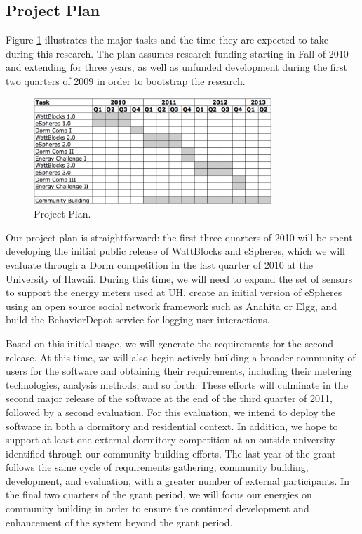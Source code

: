 \subsection{Project Plan}

Figure \ref{fig:plan} illustrates the major tasks and the time they are
expected to take during this research.  The plan assumes research funding
starting in Fall of 2010 and extending for three years, as well as unfunded
development during the first two quarters of 2009 in order to bootstrap the
research.

\begin{figure}[th]
  \center
  \includegraphics[width=0.8\textwidth]{gantt.eps}
  \caption{\small Project Plan.}
 \label{fig:plan}
\end{figure} 

Our project plan is straightforward: the first three quarters of 2010 will
be spent developing the initial public release of WattBlocks and eSpheres,
which we will evaluate through a Dorm competition in the last quarter of
2010 at the University of Hawaii.  During this time, we will need to expand
the set of sensors to support the energy meters used at UH, create an
initial version of eSpheres using an open source social network framework
such as Anahita or Elgg, and build the BehaviorDepot service for logging
user interactions.

Based on this initial usage, we will generate the requirements for the
second release.  At this time, we will also begin actively building a
broader community of users for the software and obtaining their
requirements, including their metering technologies, analysis methods, and
so forth.  These efforts will culminate in the second major release of the
software at the end of the third quarter of 2011, followed by a second
evaluation.  For this evaluation, we intend to deploy the software in both
a dormitory and residential context.  In addition, we hope to support at
least one external dormitory competition at an outside university
identified through our community building efforts.  The last year of the
grant follows the same cycle of requirements gathering, community building,
development, and evaluation, with a greater number of external
participants.  In the final two quarters of the grant period, we will focus
our energies on community building in order to ensure the continued
development and enhancement of the system beyond the grant period.

